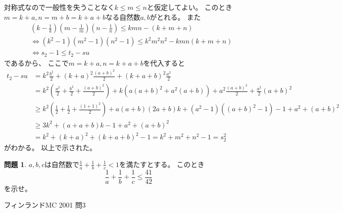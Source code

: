 \documentclass[uplatex, a5paper]{jsarticle}
\makeatletter
\theoremstyle{definition}
\newtheorem{prob}{問題}
\renewenvironment{proof}[1][\proofname]{
  \pushQED{\qed}%
  \normalfont \topsep6\p@\@plus6\p@\relax
  \trivlist
  \item[\hskip\labelsep
    #1\@addpunct{\textbf{.}}]\ignorespaces
}{%
  \popQED\endtrivlist\@endpefalse
}
\providecommand{\proofname}{証明}
\def\qed{\hfill $\Box$}
\makeatother
\begin{document}
\begin{proof}
  対称式なので一般性を失うことなく\(k\leq m \leq n\)と仮定してよい。
  このとき\(m=k+a,n=m+b=k+a+b\)なる自然数\(a,b\)がとれる。
  また
  \begin{align*}
    &\left( k-\frac{1}{k} \right) \left( m-\frac{1}{m} \right) \left( n-\frac{1}{n} \right) \leq kmn-(k+m+n) \\
    &\Leftrightarrow (k^2-1)(m^2-1)(n^2-1) \leq k^2m^2n^2 - kmn(k+m+n) \\
    &\Leftrightarrow s_2 -1 \leq t_2-su
  \end{align*}
  であるから、
  ここで\(m=k+a,n=k+a+b\)を代入すると
  \begin{align*}
    t_2-su &= k^2\frac{b^2}{2} + ( k+a )^2\frac{(a+b)^2}{2} + ( k+a+b)^2\frac{a^2}{2} \\
    &= k^2\left( \frac{a^2}{2} + \frac{b^2}{2} + \frac{(a+b)^2}{2} \right) + k\left( a(a+b)^2 + a^2(a+b) \right) +
    a^2\frac{(a+b)^2}{2} + \frac{a^2}{2}(a+b)^2 \\
    &\geq k^2\left( \frac{1}{2} + \frac{1}{2} + \frac{(1+1)^2}{2} \right) + a(a+b)(2a+b)k + (a^2-1)\left( (a+b)^2-1
    \right) -1 + a^2 + (a+b)^2 \\
    &\geq 3k^2 + (a+a+b)k -1 + a^2 + (a+b)^2 \\
    &= k^2 + (k+a)^2 + (k+a+b)^2 -1 = k^2+m^2+n^2 -1 = s_2^2
  \end{align*}
  がわかる。
  以上で示された。
\end{proof}











\newpage

\begin{prob}
  \(a,b,c\)は自然数で\(\displaystyle\frac{1}{a} + \frac{1}{b} + \frac{1}{c} < 1\)を満たすとする。
  このとき
  \[
  \frac{1}{a} + \frac{1}{b} + \frac{1}{c} \leq \frac{41}{42}
  \]
  を示せ。
  \begin{flushright}
    フィンランドMC 2001 問3
  \end{flushright}
\end{prob}
\end{document}
